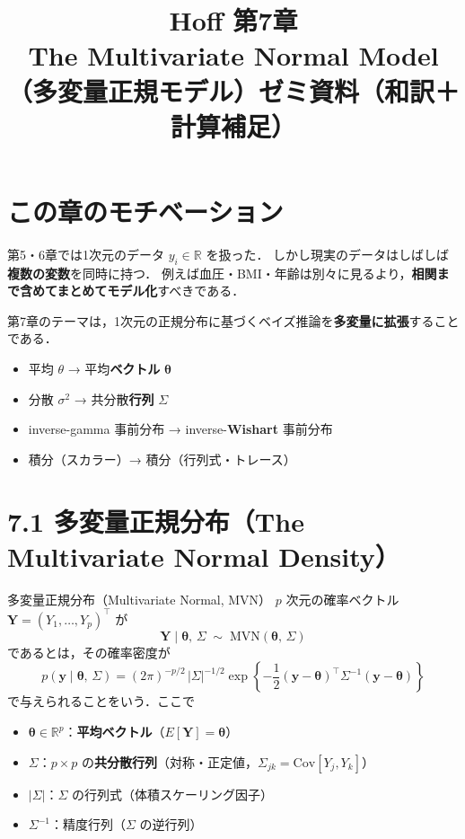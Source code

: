 \documentclass[lualatex,ja=standard,a4paper,12pt]{bxjsarticle}
\title{{\large Hoff 第7章} \\[6pt]
       \textbf{The Multivariate Normal Model} \\[4pt]
       {\normalsize （多変量正規モデル）ゼミ資料（和訳＋計算補足）}}
\author{}
\date{}
\newcommand{\mvn}{\mathrm{MVN}}
\begin{document}
\maketitle
\thispagestyle{empty}

\section{この章のモチベーション}

第5・6章では1次元のデータ $y_i \in \mathbb{R}$ を扱った．
しかし現実のデータはしばしば\textbf{複数の変数}を同時に持つ．
例えば血圧・BMI・年齢は別々に見るより，\textbf{相関まで含めてまとめてモデル化}すべきである．

\begin{pointbox}
第7章のテーマは，1次元の正規分布に基づくベイズ推論を\textbf{多変量に拡張}することである．
\begin{itemize}
  \item 平均 $\theta$ → 平均\textbf{ベクトル} $\bm{\theta}$
  \item 分散 $\sigma^2$ → 共分散\textbf{行列} $\Sigma$
  \item inverse-gamma 事前分布 → inverse-\textbf{Wishart} 事前分布
  \item 積分（スカラー）→ 積分（行列式・トレース）
\end{itemize}
\end{pointbox}

\section{7.1 多変量正規分布（The Multivariate Normal Density）}

\begin{defbox}{多変量正規分布（Multivariate Normal, MVN）}
$p$ 次元の確率ベクトル $\bm{Y} = (Y_1, \ldots, Y_p)^\top$ が
\[
  \bm{Y} \mid \bm{\theta},\, \Sigma \;\sim\; \mvn(\bm{\theta},\, \Sigma)
\]
であるとは，その確率密度が
\[
  p(\bm{y} \mid \bm{\theta},\, \Sigma)
  = (2\pi)^{-p/2}\,|\Sigma|^{-1/2}
    \exp\!\left\{-\frac{1}{2}(\bm{y} - \bm{\theta})^\top \Sigma^{-1}(\bm{y} - \bm{\theta})\right\}
\]
で与えられることをいう．ここで
\begin{itemize}
  \item $\bm{\theta} \in \mathbb{R}^p$：\textbf{平均ベクトル}（$E[\bm{Y}] = \bm{\theta}$）
  \item $\Sigma$：$p \times p$ の\textbf{共分散行列}（対称・正定値，$\Sigma_{jk} = \mathrm{Cov}[Y_j, Y_k]$）
  \item $|\Sigma|$：$\Sigma$ の行列式（体積スケーリング因子）
  \item $\Sigma^{-1}$：精度行列（$\Sigma$ の逆行列）
\end{itemize}
\end{defbox}
\end{document}
